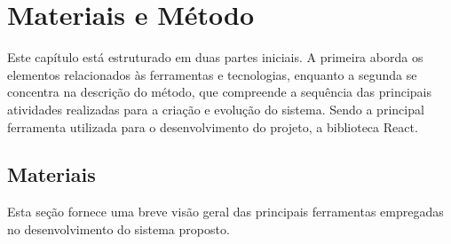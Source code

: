 
\chapter{Materiais e Método}\label{cap:materialemetodos}

Este capítulo está estruturado em duas partes iniciais. A primeira aborda os elementos relacionados às ferramentas e tecnologias, enquanto a segunda se concentra na descrição do método, que compreende a sequência das principais atividades realizadas para a criação e evolução do sistema. Sendo a principal ferramenta utilizada para o desenvolvimento do projeto, a biblioteca React.

\section{Materiais}\label{sec:materiais}

Esta seção fornece uma breve visão geral das principais ferramentas empregadas no desenvolvimento do sistema proposto.

